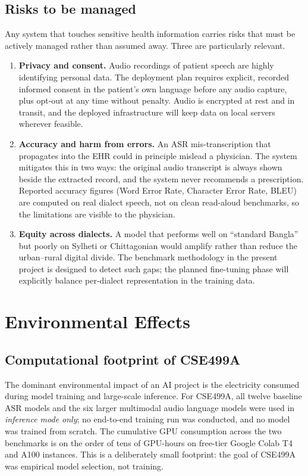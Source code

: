 \documentclass[12pt,a4paper]{article}
\begin{document}
\subsection{Risks to be managed}
Any system that touches sensitive health information carries
risks that must be actively managed rather than assumed away.
Three are particularly relevant.

\begin{enumerate}[leftmargin=*]
\item \textbf{Privacy and consent.} Audio recordings of patient
speech are highly identifying personal data. The deployment plan
requires explicit, recorded informed consent in the patient's own
language before any audio capture, plus opt-out at any time without
penalty. Audio is encrypted at rest and in transit, and the deployed
infrastructure will keep data on local servers wherever feasible.

\item \textbf{Accuracy and harm from errors.} An ASR
mis-transcription that propagates into the EHR could in principle
mislead a physician. The system mitigates this in two ways: the
original audio transcript is always shown beside the extracted
record, and the system never recommends a prescription. Reported
accuracy figures (Word Error Rate, Character Error Rate, BLEU) are
computed on real dialect speech, not on clean read-aloud benchmarks,
so the limitations are visible to the physician.

\item \textbf{Equity across dialects.} A model that performs well on
``standard Bangla'' but poorly on Sylheti or Chittagonian would
amplify rather than reduce the urban--rural digital divide.
The benchmark methodology in the present project is designed to
detect such gaps; the planned fine-tuning phase will explicitly
balance per-dialect representation in the training data.
\end{enumerate}

\section{Environmental Effects}

\subsection{Computational footprint of CSE499A}
The dominant environmental impact of an AI project is the
electricity consumed during model training and large-scale inference.
For CSE499A, all twelve baseline ASR models and the six larger
multimodal audio language models were used in \emph{inference mode
only}; no end-to-end training run was conducted, and no model was
trained from scratch. The cumulative GPU consumption across the two
benchmarks is on the order of tens of GPU-hours on free-tier Google
Colab T4 and A100 instances. This is a deliberately small footprint:
the goal of CSE499A was empirical model selection, not training.
\end{document}

